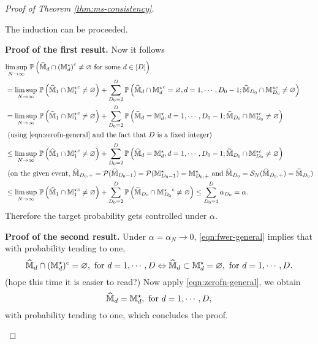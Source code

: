 \documentclass[12pt]{article}
\begin{document}
{\begin{proof}[Proof of Theorem \ref{thm:ms-consistency}]
\begin{enumerate}
    The induction can be proceeded. 
    
    
    \textbf{Proof of the first result.} Now it follows
    \begingroup
    \allowdisplaybreaks
    \begin{align}
    &\underset{N\to\infty}{\lim\sup}~{\mathbb{P}}\left(\widehat{{\mathbb{M}}}_d\cap{({\mathbb{M}}^\star_d)}^c\neq\varnothing \text{ for some }d\in[D]\right) \notag\\
    &= 
    \underset{N \to\infty}{\lim\sup}~{\mathbb{P}}\left(\widehat{{\mathbb{M}}}_1\cap{{\mathbb{M}}_1^\star}^c\neq\varnothing\right) + \sum_{D_0=2}^{D} {\mathbb{P}}\left(\widehat{{\mathbb{M}}}_d\cap{{\mathbb{M}}_d^\star}^c=\varnothing,d=1,\cdots,D_0-1; \widehat{{\mathbb{M}}}_{D_0}\cap {\mathbb{M}}_{D_0}^{\star c}\neq\varnothing\right)\notag\\
    &=
    \underset{N \to\infty}{\lim\sup}~{\mathbb{P}}\left(\widehat{{\mathbb{M}}}_1\cap{{\mathbb{M}}_1^\star}^c\neq\varnothing\right) + \sum_{D_0=2}^D {\mathbb{P}}\left( \widehat{{\mathbb{M}}}_d={\mathbb{M}}^\star_d,d=1,\cdots,D_0-1; \widehat{{\mathbb{M}}}_{D_0}\cap{{\mathbb{M}}_{D_0}^{\star c}}\neq\varnothing\right) \notag\\
    &\text{ (using \eqref{eqn:zerofn-general} and the fact that $D$ is a fixed integer)}\notag\\
    &\le \underset{N \to\infty}{\lim\sup}~{\mathbb{P}}\left(\widehat{{\mathbb{M}}}_1\cap{{\mathbb{M}}_1^\star}^c\neq\varnothing\right) + \sum_{D_0=2}^D {\mathbb{P}}\left( \widehat{{\mathbb{M}}}_d={\mathbb{M}}^\star_d,d=1,\cdots,D_0-1; \widetilde{{\mathbb{M}}}_{D_0}\cap{\mathbb{M}}_{D_0}^{\star c}\neq\varnothing\right)  \notag\\
    &\text{ (on the given event, $\widehat{{\mathbb{M}}}_{D_0,+} = {\mathcal{P}}(\widehat{{\mathbb{M}}}_{D_0-1}) = {\mathcal{P}}({{\mathbb{M}}}^\star_{D_0-1}) = {{\mathbb{M}}}^\star_{D_0,+}$ and $\widehat{{\mathbb{M}}}_{D_0} = {\mathcal{S}}_N(\widehat{{\mathbb{M}}}_{D_0,+}) = \widetilde{{\mathbb{M}}}_{D_0}$)}\notag\\
    &\le \underset{N \to\infty}{\lim\sup}~{\mathbb{P}}\left(\widehat{{\mathbb{M}}}_1\cap{{\mathbb{M}}_1^\star}^c\neq\varnothing\right) + \sum_{D_0=2}^D {\mathbb{P}}\left(  \widetilde{{\mathbb{M}}}_{D_0}\cap{{\mathbb{M}}_{D_0}^\star}^c\neq\varnothing\right)
    \le \sum_{D_0=1}^D\alpha_{D_0} = \alpha. \label{eqn:fwer-general}
\end{align}
\endgroup
Therefore the target probability gets controlled under $\alpha$.

\textbf{Proof of the second result.} Under $\alpha=\alpha_N\to0$, \eqref{eqn:fwer-general} implies that with probability tending to one, 
{
\color{blue} 
\[
\widehat{{\mathbb{M}}}_d\cap({\mathbb{M}}^\star_d)^c = \varnothing,  \text{ for } d=1,\cdots, D \Leftrightarrow \widehat{{\mathbb{M}}}_d\subset {\mathbb{M}}^\star_d = \varnothing,  \text{ for } d=1,\cdots, D.
\]
(hope this time it is easier to read?)
}
Now apply \eqref{eqn:zerofn-general}, we obtain
\[
\widehat{{\mathbb{M}}}_d={\mathbb{M}}^\star_d,  \text{ for } d=1,\cdots, D,
\]
with probability tending to one, which concludes the proof.

\end{enumerate}

\end{proof}
}
\end{document}
